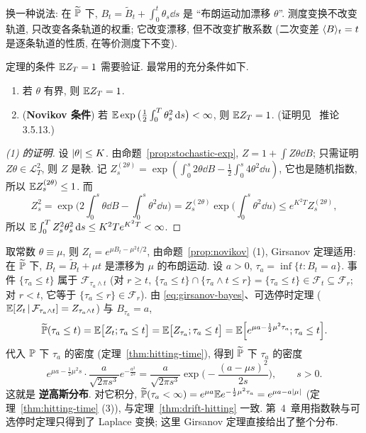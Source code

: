 换一种说法: 在 $\widetilde{\P}$ 下, $B_t=\widetilde{B}_t+\int_0^t\theta_s\dd s$ 是 ``布朗运动加漂移 $\theta$''. 测度变换不改变轨道, 只改变各条轨道的权重; 它改变漂移, 但不改变扩散系数 (二次变差 $\ip{B}_t=t$ 是逐条轨道的性质, 在等价测度下不变).

定理的条件 $\E Z_T=1$ 需要验证. 最常用的充分条件如下.

\begin{proposition}\label{prop:novikov}
\begin{enumerate}
\item 若 $\theta$ 有界, 则 $\E Z_T=1$.
\item (\textbf{Novikov 条件}) 若 $\E\exp\big(\frac{1}{2}\int_0^T\theta_s^2\dd s\big)<\infty$, 则 $\E Z_T=1$. (证明见~\cite{karatzas} 推论 3.5.13.)
\end{enumerate}
\end{proposition}

\begin{proof}[(1) 的证明]
设 $\abs{\theta}\le K$. 由命题~\ref{prop:stochastic-exp}, $Z=1+\int Z\theta\dd B$; 只需证明 $Z\theta\in\mathscr{L}^2_T$, 则 $Z$ 是鞅. 记 $Z^{(2\theta)}_s=\exp(\int_0^s2\theta\dd B-\frac{1}{2}\int_0^s4\theta^2\dd u)$, 它也是随机指数, 所以 $\E Z^{(2\theta)}_s\le1$. 而
\[
Z_s^2=\exp\Big(2\int_0^s\theta\dd B-\int_0^s\theta^2\dd u\Big)=Z^{(2\theta)}_s\exp\Big(\int_0^s\theta^2\dd u\Big)\le e^{K^2T}Z^{(2\theta)}_s,
\]
所以 $\E\int_0^TZ_s^2\theta_s^2\dd s\le K^2Te^{K^2T}<\infty$.
\end{proof}

\begin{example}[带漂移布朗运动的首达时密度]\label{ex:girsanov-drift}
取常数 $\theta\equiv\mu$, 则 $Z_t=e^{\mu B_t-\mu^2t/2}$, 由命题~\ref{prop:novikov} (1), Girsanov 定理适用: 在 $\widetilde{\P}$ 下, $B_t=\widetilde{B}_t+\mu t$ 是漂移为 $\mu$ 的布朗运动. 设 $a>0$, $\tau_a=\inf\{t: B_t=a\}$. 事件 $\{\tau_a\le t\}$ 属于 $\mathcal{F}_{\tau_a\wedge t}$ (对 $r\ge t$, $\{\tau_a\le t\}\cap\{\tau_a\wedge t\le r\}=\{\tau_a\le t\}\in\mathcal{F}_t\subseteq\mathcal{F}_r$; 对 $r<t$, 它等于 $\{\tau_a\le r\}\in\mathcal{F}_r$). 由 \eqref{eq:girsanov-bayes}、可选停时定理 ($\E[Z_t\,|\,\mathcal{F}_{\tau_a\wedge t}]=Z_{\tau_a\wedge t}$) 与 $B_{\tau_a}=a$,
\[
\widetilde{\P}(\tau_a\le t)=\E\big[Z_t;\tau_a\le t\big]=\E\big[Z_{\tau_a};\tau_a\le t\big]=\E\Big[e^{\mu a-\frac{1}{2}\mu^2\tau_a};\tau_a\le t\Big].
\]
代入 $\P$ 下 $\tau_a$ 的密度 (定理~\ref{thm:hitting-time}), 得到 $\widetilde{\P}$ 下 $\tau_a$ 的密度
\[
e^{\mu a-\frac{1}{2}\mu^2s}\cdot\frac{a}{\sqrt{2\pi s^3}}e^{-\frac{a^2}{2s}}=\frac{a}{\sqrt{2\pi s^3}}\exp\Big(-\frac{(a-\mu s)^2}{2s}\Big),\qquad s>0.
\]
这就是 \textbf{逆高斯分布}. 对它积分, $\widetilde{\P}(\tau_a<\infty)=e^{\mu a}\E e^{-\frac{1}{2}\mu^2\tau_a}=e^{\mu a-a\abs{\mu}}$ (定理~\ref{thm:hitting-time} (3)), 与定理~\ref{thm:drift-hitting} 一致. 第~4~章用指数鞅与可选停时定理只得到了 Laplace 变换; 这里 Girsanov 定理直接给出了整个分布.
\end{example}

